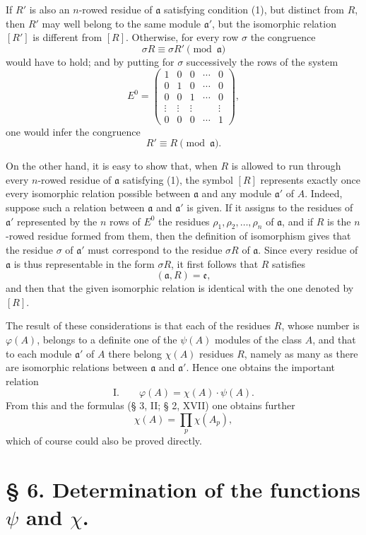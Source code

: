 \documentclass[11pt,a4paper]{article}
\begin{document}
If $R'$ is also an $n$-rowed residue of $\mathfrak a$ satisfying condition (1), but distinct from $R$, then $R'$ may well belong to the same module $\mathfrak a'$, but the isomorphic relation $[R']$ is different from $[R]$. Otherwise, for every row $\sigma$ the congruence
\[
 \sigma R\equiv\sigma R'\pmod{\mathfrak a}
\]
would have to hold; and by putting for $\sigma$ successively the rows of the system
\[
 E^0=\begin{pmatrix}
 1&0&0&\cdots&0\\
 0&1&0&\cdots&0\\
 0&0&1&\cdots&0\\
 \vdots&\vdots&\vdots&&\vdots\\
 0&0&0&\cdots&1
 \end{pmatrix},
\]
one would infer the congruence
\[
 R'\equiv R\pmod{\mathfrak a}.
\]

On the other hand, it is easy to show that, when $R$ is allowed to run through every $n$-rowed residue of $\mathfrak a$ satisfying (1), the symbol $[R]$ represents exactly once every isomorphic relation possible between $\mathfrak a$ and any module $\mathfrak a'$ of $A$. Indeed, suppose such a relation between $\mathfrak a$ and $\mathfrak a'$ is given. If it assigns to the residues of $\mathfrak a'$ represented by the $n$ rows of $E^0$ the residues $\rho_1,\rho_2,\ldots,\rho_n$ of $\mathfrak a$, and if $R$ is the $n$-rowed residue formed from them, then the definition of isomorphism gives that the residue $\sigma$ of $\mathfrak a'$ must correspond to the residue $\sigma R$ of $\mathfrak a$. Since every residue of $\mathfrak a$ is thus representable in the form $\sigma R$, it first follows that $R$ satisfies
\[
 (\mathfrak a,R)=\mathfrak e,
\]
and then that the given isomorphic relation is identical with the one denoted by $[R]$.

The result of these considerations is that each of the residues $R$, whose number is $\varphi(A)$, belongs to a definite one of the $\psi(A)$ modules of the class $A$, and that to each module $\mathfrak a'$ of $A$ there belong $\chi(A)$ residues $R$, namely as many as there are isomorphic relations between $\mathfrak a$ and $\mathfrak a'$. Hence one obtains the important relation
\[
\text{I.}\qquad \varphi(A)=\chi(A)\cdot\psi(A).
\]
From this and the formulas (§ 3, II; § 2, XVII) one obtains further
\[
 \chi(A)=\prod_p \chi(A_p),
\]
which of course could also be proved directly.

\section*{§ 6. Determination of the functions $\psi$ and $\chi$.}
\end{document}
